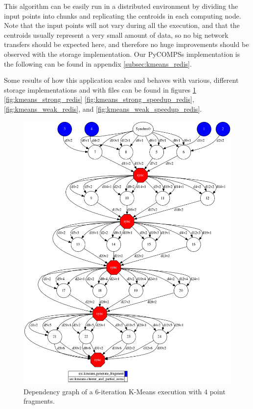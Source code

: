 This algorithm can be easily run in a distributed environment by dividing the input points into chunks and replicating the centroids in each computing node. Note that the input points will not vary during all the execution, and that the centroids usually represent a very small amount of data, so no big network transfers should be expected here, and therefore no huge improvements should be observed with the storage implementation. Our PyCOMPSs implementation is the following can be found in appendix \ref{subsec:kmeans_redis}.

Some results of how this application scales and behaves with various, different storage implementations and with files can be found in figures \ref{fig:kmeans_storage_dep_graph} \ref{fig:kmeans_strong_redis} \ref{fig:kmeans_strong_speedup_redis}, \ref{fig:kmeans_weak_redis}, and \ref{fig:kmeans_weak_speedup_redis}.

\begin{figure}[ht!]
\centering
\includegraphics[scale = 0.3]{figures/kmeans_storage_dep_graph.png}
\caption{Dependency graph of a 6-iteration K-Means execution with $4$ point fragments.}
\label{fig:kmeans_storage_dep_graph}
\end{figure}


